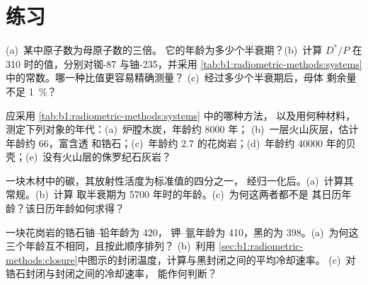 \section{练习}

\begin{exercise}[$\star$]\label{exo:b1:radiometric-methods:1}
(a)~某中原子数为母原子数的三倍。
它的年龄为多少个半衰期？(b)~计算 $D^*/P$ 在
\qty{310}{\Ma} 时的值，分别对铷-87 与铀-235，并采用
\cref{tab:b1:radiometric-methods:systems}中的常数。哪一种比值更容易精确测量？
(c)~经过多少个半衰期后，母体
剩余量不足 \qty{1}{\percent}？
\end{exercise}

\begin{exercise}[$\star$]\label{exo:b1:radiometric-methods:2}
应采用 \cref{tab:b1:radiometric-methods:systems} 中的哪种方法，
以及用何种材料，测定下列对象的年代：(a)~炉膛木炭，年龄约 \num{8000} 年；
(b)~一层火山灰层，估计年龄约 \qty{66}{\Ma}，富含透
和锆石；(c)~年龄约 \qty{2.7}{\Ga} 的花岗岩；(d)~年龄约
\num{40000} 年的贝壳；(e)~没有火山层的侏罗纪石灰岩？
\end{exercise}

\begin{exercise}[$\star$]\label{exo:b1:radiometric-methods:3}
一块木材中的碳，其放射性活度为标准值的四分之一，
经归一化后。(a)~计算其常规。(b)~计算
取半衰期为 \num{5700} 年时的年龄。(c)~为何这两者都不是
其日历年龄？该日历年龄如何求得？
\end{exercise}

\begin{exercise}[$\star$]\label{exo:b1:radiometric-methods:4}
一块花岗岩的锆石铀–铅年龄为 \qty{420}{\Ma}，
钾–氩年龄为 \qty{410}{\Ma}，黑的为
\qty{398}{\Ma}。(a)~为何这三个年龄互不相同，且按此顺序排列？
(b)~利用
\cref{sec:b1:radiometric-methods:closure}中图示的封闭温度，计算与黑封闭之间的平均冷却速率。
(c)~对锆石封闭与封闭之间的冷却速率，
能作何判断？
\end{exercise}

